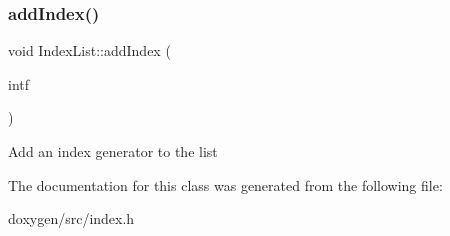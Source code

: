 \subsubsection{\texorpdfstring{addIndex()}{addIndex()}}
{\footnotesize\ttfamily void Index\+List\+::add\+Index (\begin{DoxyParamCaption}\item[{\mbox{\hyperlink{class_index_intf}{Index\+Intf}} $\ast$}]{intf }\end{DoxyParamCaption})\hspace{0.3cm}{\ttfamily [inline]}}

Add an index generator to the list 

The documentation for this class was generated from the following file\+:\begin{DoxyCompactItemize}
\item 
doxygen/src/index.\+h\end{DoxyCompactItemize}
